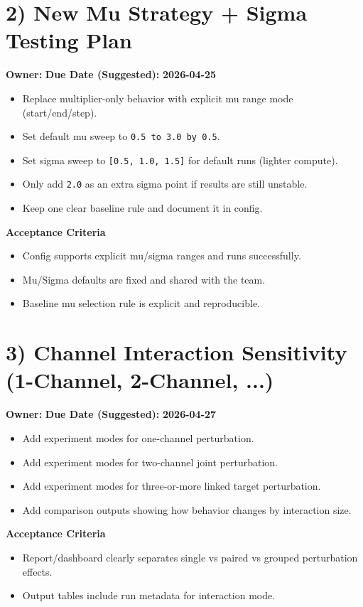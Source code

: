 \documentclass[11pt]{article}
\begin{document}
\section*{2) New Mu Strategy + Sigma Testing Plan}
\textbf{Owner:} \underline{\hspace{2.0in}} \textbf{Due Date (Suggested):} \textbf{2026-04-25}
\vspace{0.15in}
\begin{itemize}
  \item[$\square$] Replace multiplier-only behavior with explicit mu range mode (start/end/step).
  \item[$\square$] Set default mu sweep to \texttt{0.5 to 3.0 by 0.5}.
  \item[$\square$] Set sigma sweep to \texttt{[0.5, 1.0, 1.5]} for default runs (lighter compute).
  \item[$\square$] Only add \texttt{2.0} as an extra sigma point if results are still unstable.
  \item[$\square$] Keep one clear baseline rule and document it in config.
\end{itemize}
\textbf{Acceptance Criteria}
\begin{itemize}
  \item[$\square$] Config supports explicit mu/sigma ranges and runs successfully.
  \item[$\square$] Mu/Sigma defaults are fixed and shared with the team.
  \item[$\square$] Baseline mu selection rule is explicit and reproducible.
\end{itemize}

\section*{3) Channel Interaction Sensitivity (1-Channel, 2-Channel, ...)}
\textbf{Owner:} \underline{\hspace{2.0in}} \textbf{Due Date (Suggested):} \textbf{2026-04-27}
\vspace{0.15in}
\begin{itemize}
  \item[$\square$] Add experiment modes for one-channel perturbation.
  \item[$\square$] Add experiment modes for two-channel joint perturbation.
  \item[$\square$] Add experiment modes for three-or-more linked target perturbation.
  \item[$\square$] Add comparison outputs showing how behavior changes by interaction size.
\end{itemize}
\textbf{Acceptance Criteria}
\begin{itemize}
  \item[$\square$] Report/dashboard clearly separates single vs paired vs grouped perturbation effects.
  \item[$\square$] Output tables include run metadata for interaction mode.
\end{itemize}
\end{document}
